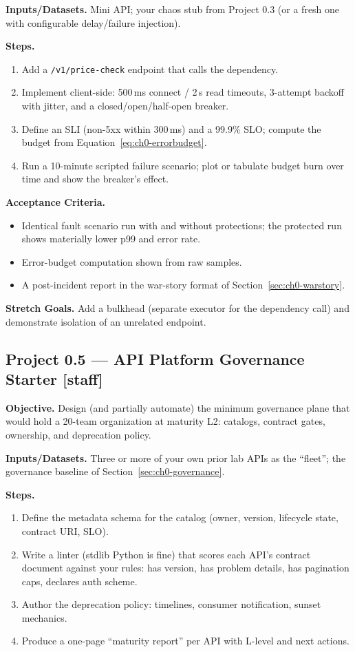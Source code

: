 \textbf{Inputs/Datasets.} Mini API; your chaos stub from Project 0.3 (or a
fresh one with configurable delay/failure injection).

\textbf{Steps.}
\begin{enumerate}
  \item Add a \texttt{/v1/price-check} endpoint that calls the dependency.
  \item Implement client-side: 500\,ms connect / 2\,s read timeouts,
        3-attempt backoff with jitter, and a closed/open/half-open breaker.
  \item Define an SLI (non-5xx within 300\,ms) and a 99.9\% SLO; compute the
        budget from Equation~\eqref{eq:ch0-errorbudget}.
  \item Run a 10-minute scripted failure scenario; plot or tabulate budget
        burn over time and show the breaker's effect.
\end{enumerate}

\textbf{Acceptance Criteria.}
\begin{itemize}
  \item[$\square$] Identical fault scenario run with and without protections;
    the protected run shows materially lower p99 and error rate.
  \item[$\square$] Error-budget computation shown from raw samples.
  \item[$\square$] A post-incident report in the war-story format of
    Section~\ref{sec:ch0-warstory}.
\end{itemize}

\textbf{Stretch Goals.} Add a bulkhead (separate executor for the
dependency call) and demonstrate isolation of an unrelated endpoint.

\subsection{Project 0.5 --- API Platform Governance Starter
  \textnormal{[staff]}}

\textbf{Objective.} Design (and partially automate) the minimum governance
plane that would hold a 20-team organization at maturity L2: catalogs,
contract gates, ownership, and deprecation policy.

\textbf{Inputs/Datasets.} Three or more of your own prior lab APIs as the
``fleet''; the governance baseline of Section~\ref{sec:ch0-governance}.

\textbf{Steps.}
\begin{enumerate}
  \item Define the metadata schema for the catalog (owner, version, lifecycle
        state, contract URI, SLO).
  \item Write a linter (stdlib Python is fine) that scores each API's
        contract document against your rules: has version, has problem
        details, has pagination caps, declares auth scheme.
  \item Author the deprecation policy: timelines, consumer notification,
        sunset mechanics.
  \item Produce a one-page ``maturity report'' per API with L-level and
        next actions.
\end{enumerate}

